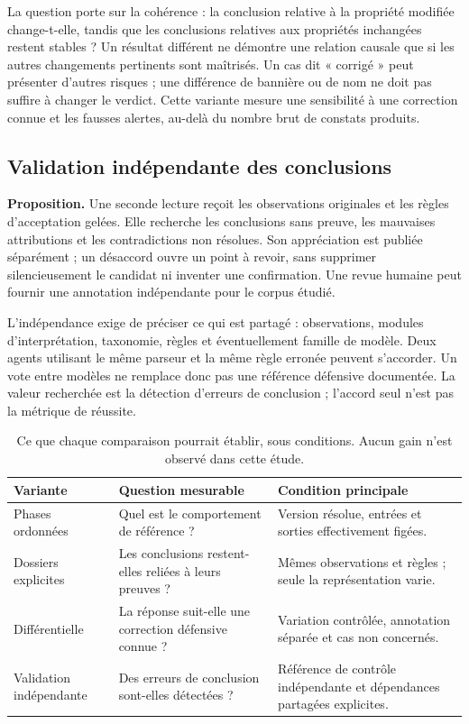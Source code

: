 \documentclass[11pt,a4paper]{article}
\begin{document}
La question porte sur la cohérence : la conclusion relative à la propriété
modifiée change-t-elle, tandis que les conclusions relatives aux propriétés
inchangées restent stables ? Un résultat différent ne démontre une relation
causale que si les autres changements pertinents sont maîtrisés. Un cas dit
« corrigé » peut présenter d'autres risques ; une différence de bannière ou
de nom ne doit pas suffire à changer le verdict. Cette variante mesure une
sensibilité à une correction connue et les fausses alertes, au-delà du nombre
brut de constats produits.

\subsection{Validation indépendante des conclusions}
\textbf{Proposition.} Une seconde lecture reçoit les observations originales et
les règles d'acceptation gelées. Elle recherche les conclusions sans preuve,
les mauvaises attributions et les contradictions non résolues. Son appréciation
est publiée séparément ; un désaccord ouvre un point à revoir, sans supprimer
silencieusement le candidat ni inventer une confirmation. Une revue humaine
peut fournir une annotation indépendante pour le corpus étudié.

L'indépendance exige de préciser ce qui est partagé : observations, modules d'interprétation,
taxonomie, règles et éventuellement famille de modèle. Deux agents utilisant
le même parseur et la même règle erronée peuvent s'accorder. Un vote entre
modèles ne remplace donc pas une référence défensive documentée. La valeur
recherchée est la détection d'erreurs de conclusion ; l'accord seul n'est pas
la métrique de réussite.

\begin{table}[htbp]
\centering\small
\caption{Ce que chaque comparaison pourrait établir, sous conditions. Aucun
gain n'est observé dans cette étude.}
\label{tab:architectures}
\begin{tabularx}{\textwidth}{@{}p{31mm}YY@{}}
\toprule Variante & Question mesurable & Condition principale \\
\midrule
Phases ordonnées & Quel est le comportement de référence ? & Version résolue,
entrées et sorties effectivement figées. \\
Dossiers explicites & Les conclusions restent-elles reliées à leurs preuves ? &
Mêmes observations et règles ; seule la représentation varie. \\
Différentielle & La réponse suit-elle une correction défensive connue ? &
Variation contrôlée, annotation séparée et cas non concernés. \\
Validation indépendante & Des erreurs de conclusion sont-elles détectées ? &
Référence de contrôle indépendante et dépendances partagées explicites. \\
\bottomrule
\end{tabularx}
\end{table}
\end{document}
